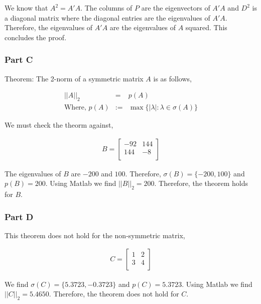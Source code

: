We know that \(A^{2} = A'A\).
The columns of \(P\) are the eigenvectors of \(A'A\) and \(D^{2}\) is a diagonal matrix where the diagonal entries are the eigenvalues of \(A'A\).
Therefore, the eigenvalues of \(A'A\) are the eigenvalues of \(A\) squared.
This concludes the proof.

\subsubsection{Part C}

Theorem: The 2-norm of a symmetric matrix \(A\) is as follows,

\begin{eqnarray}
  ||A||_2 &=& p(A) \\
  \text{Where, }
  p(A) &:=& \max \{|\lambda| : \lambda \in \sigma(A)\}
\end{eqnarray}

We must check the theorm against,

\begin{eqnarray}
  B =
  \begin{bmatrix}
    -92 & 144 \\
    144 & -8 \\
  \end{bmatrix}
\end{eqnarray}

The eigenvalues of \(B\) are \(-200\) and \(100\). Therefore, \(\sigma(B) = \{-200,100\}\) and \(p(B) = 200\).
Using Matlab we find \(||B||_2 = 200\).
Therefore, the theorem holds for \(B\).



\subsubsection{Part D}

This theorem does not hold for the non-symmetric matrix,

\begin{eqnarray}
  C = 
  \begin{bmatrix}
    1 & 2 \\
    3 & 4 \\
  \end{bmatrix}
\end{eqnarray}

We find \(\sigma(C) = \{5.3723, -0.3723\}\) and \(p(C) = 5.3723\).
Using Matlab we find \(||C||_2 = 5.4650\).
Therefore, the theorem does not hold for \(C\).

